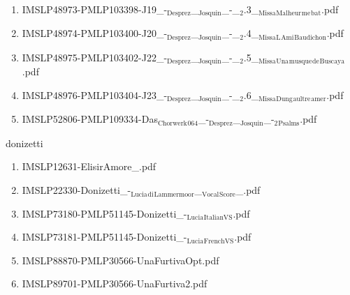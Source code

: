 \documentclass[11pt]{article}
\begin{document}
\begin{enumerate}
\item IMSLP48973-PMLP103398-J19\_-$_{\text{Desprez}}$\_$_{\text{Josquin}}$\_-\_$_{\text{2}}$.3\_$_{\text{Missa}}$$_{\text{Malheur}}$$_{\text{me}}$$_{\text{bat}}$.pdf
\label{sec-1-1-1-1-44-25-9}

\item IMSLP48974-PMLP103400-J20\_-$_{\text{Desprez}}$\_$_{\text{Josquin}}$\_-\_$_{\text{2}}$.4\_$_{\text{Missa}}$$_{\text{L}}$$_{\text{Ami}}$$_{\text{Baudichon}}$.pdf
\label{sec-1-1-1-1-44-25-10}

\item IMSLP48975-PMLP103402-J22\_-$_{\text{Desprez}}$\_$_{\text{Josquin}}$\_-\_$_{\text{2}}$.5\_$_{\text{Missa}}$$_{\text{Una}}$$_{\text{musque}}$$_{\text{de}}$$_{\text{Buscaya}}$.pdf
\label{sec-1-1-1-1-44-25-11}

\item IMSLP48976-PMLP103404-J23\_-$_{\text{Desprez}}$\_$_{\text{Josquin}}$\_-\_$_{\text{2}}$.6\_$_{\text{Missa}}$$_{\text{Dung}}$$_{\text{aultre}}$$_{\text{amer}}$.pdf
\label{sec-1-1-1-1-44-25-12}

\item IMSLP52806-PMLP109334-Das$_{\text{Chorwerk}}$$_{\text{064}}$\_-$_{\text{Desprez}}$\_$_{\text{Josquin}}$\_-$_{\text{2}}$$_{\text{Psalms}}$.pdf
\label{sec-1-1-1-1-44-25-13}
\end{enumerate}

\item donizetti
\label{sec-1-1-1-1-44-26}
\begin{enumerate}
\item IMSLP12631-ElisirAmore\_.pdf
\label{sec-1-1-1-1-44-26-1}

\item IMSLP22330-Donizetti\_-$_{\text{Lucia}}$$_{\text{di}}$$_{\text{Lammermoor}}$\_$_{\text{Vocal}}$$_{\text{Score}}$\_.pdf
\label{sec-1-1-1-1-44-26-2}

\item IMSLP73180-PMLP51145-Donizetti\_-$_{\text{Lucia}}$$_{\text{ItalianVS}}$.pdf
\label{sec-1-1-1-1-44-26-3}

\item IMSLP73181-PMLP51145-Donizetti\_-$_{\text{Lucia}}$$_{\text{FrenchVS}}$.pdf
\label{sec-1-1-1-1-44-26-4}

\item IMSLP88870-PMLP30566-UnaFurtivaOpt.pdf
\label{sec-1-1-1-1-44-26-5}

\item IMSLP89701-PMLP30566-UnaFurtiva2.pdf
\label{sec-1-1-1-1-44-26-6}
\end{enumerate}
\end{document}
